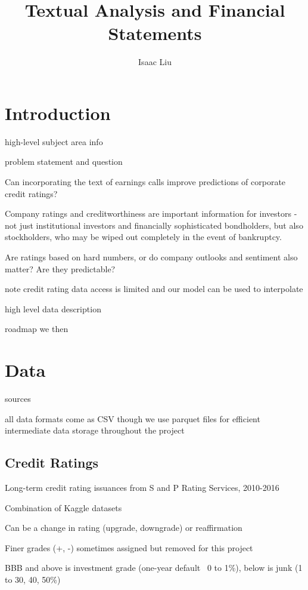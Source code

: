 \documentclass{article}
\title{Textual Analysis and Financial Statements}
\author{Isaac Liu}
\begin{document}
	\maketitle

    \section*{Introduction}

    high-level subject area info

    \citep{das_credit_2023}

    problem statement and question

    Can incorporating the text of earnings calls improve predictions of corporate credit ratings?

    Company ratings and creditworthiness are important information for investors - not just institutional investors and financially sophisticated bondholders, but also stockholders, who may be wiped out completely in the event of bankruptcy.

    Are ratings based on hard numbers, or do company outlooks and sentiment also matter? Are they predictable?

    note credit rating data access is limited and our model can be used to interpolate

    high level data description

    roadmap
    we then

    \section*{Data}

    sources

    all data formats come as CSV though we use parquet files for efficient intermediate data storage throughout the project

    \subsection*{Credit Ratings}

    Long-term credit rating issuances from S and P Rating Services, 2010-2016

    Combination of Kaggle datasets

    Can be a change in rating (upgrade, downgrade) or reaffirmation

    Finer grades (+, -) sometimes assigned but removed for this project

    BBB and above is investment grade (one-year default ~0 to 1\%), below is junk (1 to 30, 40, 50\%)
\end{document}
